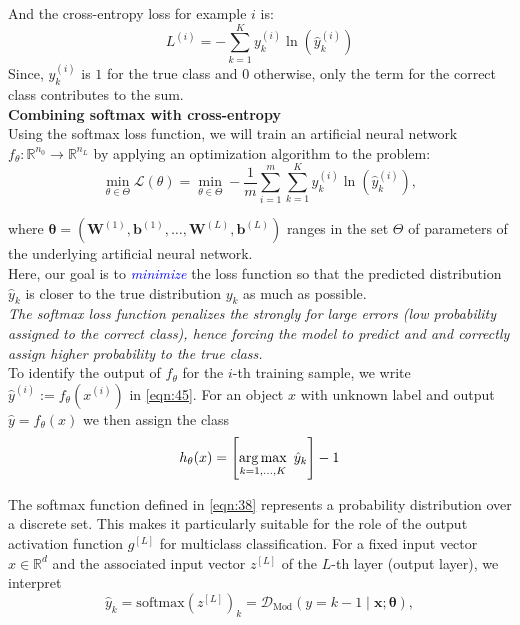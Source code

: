 And the cross-entropy loss for example $i$ is:
\begin{equation}
    L^{(i)} = - \sum_{k=1}^{K} y_k^{(i)} \ln (\hat{y}_k^{(i)})
    \label{eqn:44}
\end{equation}
Since, $y_k^{(i)}$ is $1$ for the true class and $0$ otherwise, only the term for the correct class contributes to the sum.\\

\textbf{Combining softmax with cross-entropy}\\

Using the softmax loss function, we will train an artificial neural network $f_{\theta}: \mathbb{R}^{n_0} \rightarrow \mathbb{R}^{n_L}$ by applying an optimization algorithm to the problem:
\begin{equation}
    \min_{\theta \in \Theta} \mathcal{L}(\theta) = \min_{\theta \in \Theta} - \frac{1}{m} \sum_{i=1}^{m} \sum_{k=1}^{K} y^{(i)}_k \ln(\hat{y}_k^{(i)}),
    \label{eqn:45}
\end{equation}

where $\boldsymbol{\theta} = (\boldsymbol{W}^{(1)}, \boldsymbol{b}^{(1)}, \ldots, \boldsymbol{W}^{(L)}, \boldsymbol{b}^{(L)})$ ranges in the set $\Theta$ of parameters of the underlying artificial neural network.\\

Here, our goal is to \textcolor{blue}{\emph{minimize}} the loss function so that the predicted distribution $\hat{y}_k$ is closer to the true distribution $y_k$ as much as possible.\\

\emph{The softmax loss function penalizes the strongly for large errors (low probability assigned to the correct class), hence forcing the model to predict and and correctly assign higher probability to the true class.}\\


To identify the output of $f_{\theta}$ for the $i$-th training sample, we write $\hat{y}^{(i)}:= f_{\theta}(x^{(i)})$ in \ref{eqn:45}. For an object $x$ with unknown label and output $\hat{y} = f_{\theta}(x)$ we then assign the class
\begin{equation}
    h_{\theta}(x) = \left[ \operatorname*{arg\,max}_{k=1, \ldots, K}\text{ } \hat{y}_k \right] - 1
    \label{eqn:46}
\end{equation}

The softmax function defined in \ref{eqn:38} represents a probability distribution over a discrete set. This makes it particularly suitable for the role of the output activation function $g^{[L]}$ for multiclass
classification. For a fixed input vector $x \in \mathbb{R}^d$ and the associated input vector $z^{[L]}$ of the $L$-th layer (output layer), we interpret
\begin{equation}
    \hat{y}_k = \text{softmax}(z^{[L]})_k = \mathcal{D}_{\text{Mod}}(y = k - 1 \mid \boldsymbol{x}; \boldsymbol{\theta}),
    \label{eqn:47}
\end{equation}

